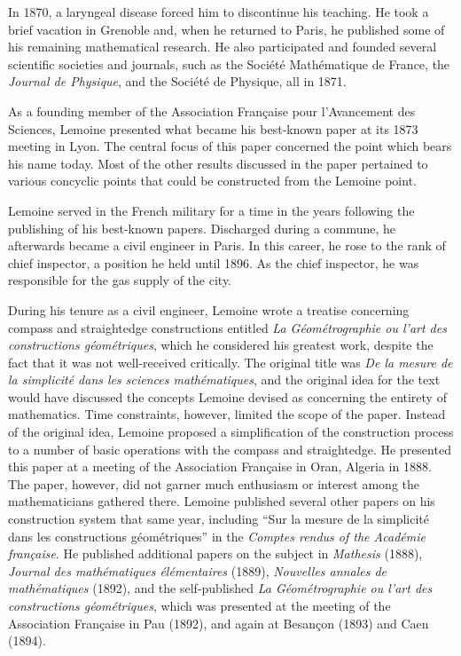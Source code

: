 \documentclass[12pt]{article}
\begin{document}
In 1870, a laryngeal disease forced him to discontinue his teaching. He took a brief vacation in Grenoble and, when he returned to Paris, he published some of his remaining mathematical research. He also participated and founded several scientific societies and journals, such as the Soci\'et\'e Math\'ematique de France, the {\it Journal de Physique}, and the Soci\'et\'e de Physique, all in 1871.

As a founding member of the Association Fran\c{c}aise pour l'Avancement des Sciences, Lemoine presented what became his best-known paper at its 1873 meeting in Lyon. The central focus of this paper concerned the point which bears his name today. Most of the other results discussed in the paper pertained to various concyclic points that could be constructed from the Lemoine point.

Lemoine served in the French military for a time in the years following the publishing of his best-known papers. Discharged during a commune, he afterwards became a civil engineer in Paris. In this career, he rose to the rank of chief inspector, a position he held until 1896. As the chief inspector, he was responsible for the gas supply of the city.

During his tenure as a civil engineer, Lemoine wrote a treatise concerning compass and straightedge constructions entitled {\it La G\'eom\'etrographie ou l'art des constructions g\'eom\'etriques}, which he considered his greatest work, despite the fact that it was not well-received critically. The original title was {\it De la mesure de la simplicit\'e dans les sciences math\'ematiques}, and the original idea for the text would have discussed the concepts Lemoine devised as concerning the entirety of mathematics. Time constraints, however, limited the scope of the paper. Instead of the original idea, Lemoine proposed a simplification of the construction process to a number of basic operations with the compass and straightedge. He presented this paper at a meeting of the Association Fran\c{c}aise in Oran, Algeria in 1888. The paper, however, did not garner much enthusiasm or interest among the mathematicians gathered there. Lemoine published several other papers on his construction system that same year, including ``Sur la mesure de la simplicit\'e dans les constructions g\'eom\'etriques'' in the {\it Comptes rendus of the Acad\'emie fran\c{c}aise}. He published additional papers on the subject in {\it Mathesis} (1888), {\it Journal des math\'ematiques \'el\'ementaires} (1889), {\it Nouvelles annales de math\'ematiques} (1892), and the self-published {\it La G\'eom\'etrographie ou l'art des constructions g\'eom\'etriques}, which was presented at the meeting of the Association Fran\c{c}aise in Pau (1892), and again at Besan\c{c}on (1893) and Caen (1894).
\end{document}
